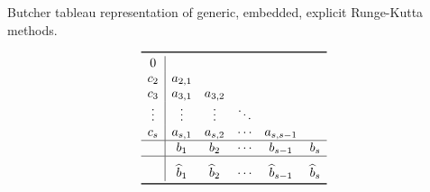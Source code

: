 \begin{table}[htpb]
    \centering
    \caption[Butcher tableau representation of generic, embedded, explicit
    Runge-Kutta methods]
    {Butcher tableau representation of generic, embedded, explicit Runge-Kutta
    methods.}
    \label{tab:genericembeddedbutcher}
    \[\renewcommand{\arraystretch}{1}
    \begin{array}{c|ccccc}
    \toprule
    0 \\
    c_{2} & a_{2,1} \\
    c_{3} & a_{3,1} & a_{3,2} \\
    \vdots & \vdots & \vdots & \ddots \\
    c_{s} & a_{s,1} & a_{s,2} & \cdots & a_{s,s-1}\\
    \hline
    & b_{1} & b_{2} & \cdots & b_{s-1} & b_{s} \\
    \hline
    \rule{0pt}{16pt} & \widehat{b}_{1} & \widehat{b}_{2} & \cdots & \widehat{b}_{s-1} %
    & \widehat{b}_{s} \\
    \bottomrule
    \end{array}
\]
\end{table}
